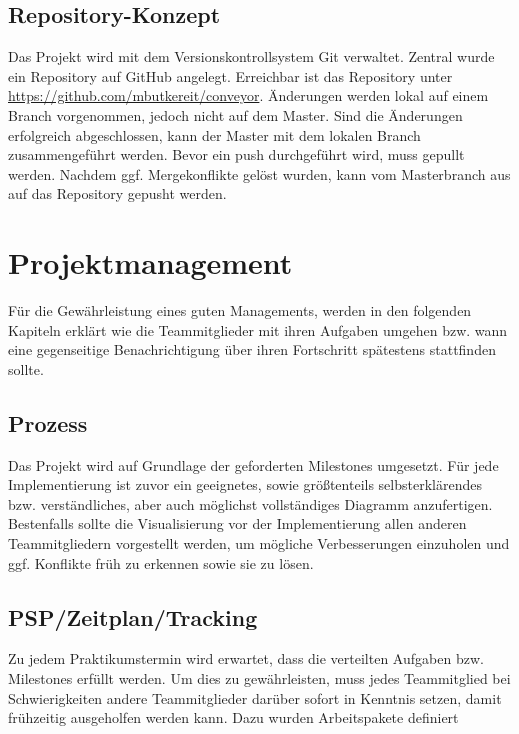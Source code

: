 \documentclass[a4paper, 11pt]{article}
\begin{document}
\newpage

\subsection{Repository-Konzept}
Das Projekt wird mit dem Versionskontrollsystem Git verwaltet. Zentral wurde ein Repository auf GitHub angelegt. Erreichbar ist das Repository unter \url{https://github.com/mbutkereit/conveyor}. Änderungen werden lokal auf einem Branch vorgenommen, jedoch nicht auf dem Master. Sind die Änderungen erfolgreich abgeschlossen, kann der Master mit dem lokalen Branch zusammengeführt werden. Bevor ein push durchgeführt wird, muss gepullt werden. Nachdem ggf. Mergekonflikte gelöst wurden, kann vom Masterbranch aus auf das Repository gepusht werden.

\section{Projektmanagement}
Für die Gewährleistung eines guten Managements, werden in den folgenden Kapiteln erklärt wie die Teammitglieder mit ihren Aufgaben umgehen bzw. wann eine gegenseitige Benachrichtigung über ihren Fortschritt spätestens stattfinden sollte.

\subsection{Prozess}
Das Projekt wird auf Grundlage der geforderten Milestones umgesetzt. Für jede Implementierung ist zuvor ein geeignetes, sowie größtenteils selbsterklärendes bzw. verständliches, aber auch möglichst vollständiges Diagramm anzufertigen. Bestenfalls sollte die Visualisierung vor der Implementierung allen anderen Teammitgliedern vorgestellt werden, um mögliche Verbesserungen einzuholen und ggf. Konflikte früh zu erkennen sowie sie zu lösen.

\subsection{PSP/Zeitplan/Tracking}
Zu jedem Praktikumstermin wird erwartet, dass die verteilten Aufgaben bzw. Milestones erfüllt werden. Um dies zu gewährleisten, muss jedes Teammitglied bei Schwierigkeiten andere Teammitglieder darüber sofort in Kenntnis setzen, damit frühzeitig ausgeholfen werden kann. Dazu wurden Arbeitspakete definiert
\end{document}
